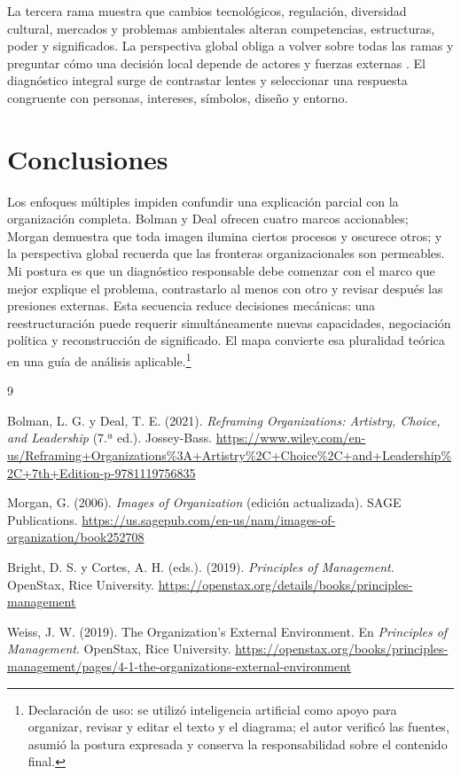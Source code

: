\documentclass[spanish,letterpaper,oneside]{article}
\begin{document}
La tercera rama muestra que cambios tecnológicos, regulación, diversidad cultural, mercados y problemas ambientales alteran competencias, estructuras, poder y significados. La perspectiva global obliga a volver sobre todas las ramas y preguntar cómo una decisión local depende de actores y fuerzas externas \citep{openstaxEnvironment2019}. El diagnóstico integral surge de contrastar lentes y seleccionar una respuesta congruente con personas, intereses, símbolos, diseño y entorno.

\clearpage
\section{Conclusiones}

Los enfoques múltiples impiden confundir una explicación parcial con la organización completa. Bolman y Deal ofrecen cuatro marcos accionables; Morgan demuestra que toda imagen ilumina ciertos procesos y oscurece otros; y la perspectiva global recuerda que las fronteras organizacionales son permeables. Mi postura es que un diagnóstico responsable debe comenzar con el marco que mejor explique el problema, contrastarlo al menos con otro y revisar después las presiones externas. Esta secuencia reduce decisiones mecánicas: una reestructuración puede requerir simultáneamente nuevas capacidades, negociación política y reconstrucción de significado. El mapa convierte esa pluralidad teórica en una guía de análisis aplicable.\footnote{Declaración de uso: se utilizó inteligencia artificial como apoyo para organizar, revisar y editar el texto y el diagrama; el autor verificó las fuentes, asumió la postura expresada y conserva la responsabilidad sobre el contenido final.}

\clearpage
\begin{thebibliography}{9}

Bolman, L. G. y Deal, T. E. (2021).
\textit{Reframing Organizations: Artistry, Choice, and Leadership} (7.ª ed.).
Jossey-Bass. \url{https://www.wiley.com/en-us/Reframing+Organizations%3A+Artistry%2C+Choice%2C+and+Leadership%2C+7th+Edition-p-9781119756835}

Morgan, G. (2006).
\textit{Images of Organization} (edición actualizada).
SAGE Publications. \url{https://us.sagepub.com/en-us/nam/images-of-organization/book252708}

Bright, D. S. y Cortes, A. H. (eds.). (2019).
\textit{Principles of Management}.
OpenStax, Rice University. \url{https://openstax.org/details/books/principles-management}

Weiss, J. W. (2019).
The Organization's External Environment.
En \textit{Principles of Management}. OpenStax, Rice University.
\url{https://openstax.org/books/principles-management/pages/4-1-the-organizations-external-environment}

\end{thebibliography}
\end{document}
